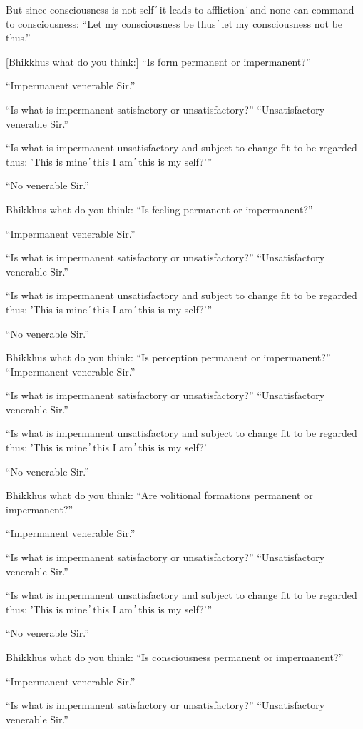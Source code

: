But since consciousness is not-self  ̓  it leads to affliction  ̓  and none can command to consciousness: “Let my consciousness be thus  ̓  let my consciousness not be thus.”

[Bhikkhus what do you think:] “Is form permanent or impermanent?”

“Impermanent venerable Sir.”

“Is what is impermanent satisfactory or unsatisfactory?” “Unsatisfactory venerable Sir.”

“Is what is impermanent unsatisfactory and subject to change fit to be regarded thus: 'This is mine  ̓  this I am  ̓  this is my self?'”

“No venerable Sir.”

Bhikkhus what do you think: “Is feeling permanent or impermanent?”

“Impermanent venerable Sir.”

“Is what is impermanent satisfactory or unsatisfactory?” “Unsatisfactory venerable Sir.”

“Is what is impermanent unsatisfactory and subject to change fit to be regarded thus: 'This is mine  ̓  this I am  ̓  this is my self?'”

“No venerable Sir.”

Bhikkhus what do you think: “Is perception permanent or impermanent?” “Impermanent venerable Sir.”

“Is what is impermanent satisfactory or unsatisfactory?” “Unsatisfactory venerable Sir.”

“Is what is impermanent unsatisfactory and subject to change fit to be regarded thus: 'This is mine  ̓  this I am  ̓  this is my self?'

“No venerable Sir.”

Bhikkhus what do you think: “Are volitional formations permanent or impermanent?”

“Impermanent venerable Sir.”

“Is what is impermanent satisfactory or unsatisfactory?” “Unsatisfactory venerable Sir.”

“Is what is impermanent unsatisfactory and subject to change fit to be regarded thus: 'This is mine  ̓  this I am  ̓  this is my self?'”

“No venerable Sir.”

Bhikkhus what do you think: “Is consciousness permanent or impermanent?”

“Impermanent venerable Sir.”

“Is what is impermanent satisfactory or unsatisfactory?” “Unsatisfactory venerable Sir.”

